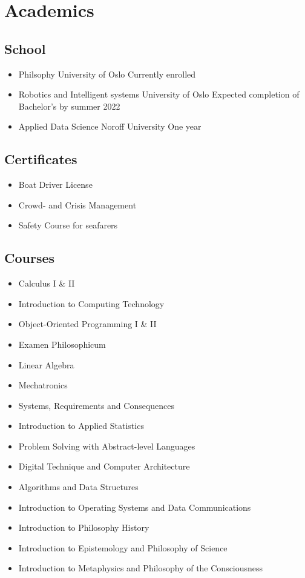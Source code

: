 \documentclass{curriculum}
\begin{document}
	\section{Academics}
	\begin{half}
	\subsection{School}
		\begin{itemize}
			\item Philsophy
				\subitem University of Oslo
				\subitem Currently enrolled
			\item Robotics and Intelligent systems
				\subitem University of Oslo
				\subitem Expected completion of Bachelor's by summer 2022
			\item Applied Data Science
				\subitem Noroff University
				\subitem One year
		\end{itemize}
	\subsection{Certificates}
		\begin{itemize}
			\item Boat Driver License
			\item Crowd- and Crisis Management
			\item Safety Course for seafarers
		\end{itemize}
	\end{half}
	\begin{half}
	\subsection{Courses}
		\begin{itemize}
			\item Calculus I \& II
			\item Introduction to Computing Technology
			\item Object-Oriented Programming I \& II
			\item Examen Philosophicum
			\item Linear Algebra
			\item Mechatronics
			\item Systems, Requirements and Consequences
			\item Introduction to Applied Statistics
			\item Problem Solving with Abstract-level Languages
			\item Digital Technique and Computer Architecture
			\item Algorithms and Data Structures
			\item Introduction to Operating Systems and Data Communications
			\item Introduction to Philosophy History
			\item Introduction to Epistemology and Philosophy of Science
			\item Introduction to Metaphysics and Philosophy of the Consciousness
		\end{itemize}
	\end{half}
\end{document}
